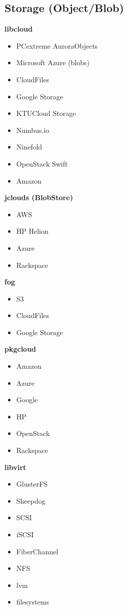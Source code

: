\subsection{Storage (Object/Blob)}
\textbf{libcloud}
\begin{multicols}{2}
\begin{itemize}
\item PCextreme AuroraObjects
\item Microsoft Azure (blobs)
\item CloudFiles
\item Google Storage
\item KTUCloud Storage
\item Numbus.io
\item Ninefold
\item OpenStack Swift
\item Amazon
\end{itemize}
\end{multicols}

\textbf{jclouds (BlobStore)}
\begin{multicols}{2}
\begin{itemize}
\item AWS
\item HP Helion
\item Azure
\item Rackspace
\end{itemize}
\end{multicols}

\textbf{fog}
\begin{multicols}{2}
\begin{itemize}
\item S3
\item CloudFiles
\item Google Storage
\end{itemize}
\end{multicols}

\textbf{pkgcloud}
\begin{multicols}{2}
\begin{itemize}
\item Amazon
\item Azure
\item Google
\item HP
\item OpenStack
\item Rackspace
\end{itemize}
\end{multicols}

\textbf{libvirt}
\begin{multicols}{2}
\begin{itemize}
  \item GlusterFS
  \item Sheepdog
  \item SCSI
  \item iSCSI
  \item FiberChannel
  \item NFS
  \item lvm
  \item filesystems
\end{itemize}
\end{multicols}

